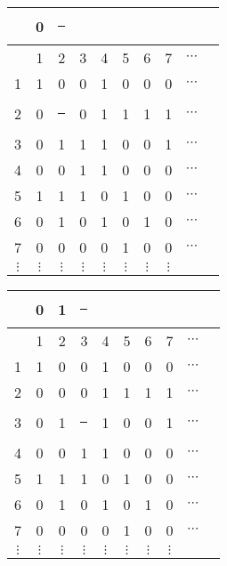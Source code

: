 \documentclass[compress,17pt]{beamer}
\newcommand\hl{\bgroup\markoverwith
    {\textcolor{yellow}{\rule[-.5ex]{.1pt}{2.5ex}}}\ULon}
\begin{document}
\begin{frame}
  \begin{tabular}{ | c | c c c c c c c c c }
    \hline
    &  0 & \hl 1 \\
    \hline
      & 1 & 2 & 3 & 4 & 5 & 6 & 7 & $\cdots$\\
      \hline
    1 & 1 & 0 & 0 & 1 & 0 & 0 & 0 & $\cdots$\\
    2 & 0 & \hl 0 & 0 & 1 & 1 & 1 & 1 & $\cdots$\\
    3 & 0 & 1 & 1 & 1 & 0 & 0 & 1 & $\cdots$\\
    4 & 0 & 0 & 1 & 1 & 0 & 0 & 0 & $\cdots$\\
    5 & 1 & 1 & 1 & 0 & 1 & 0 & 0 & $\cdots$\\
    6 & 0 & 1 & 0 & 1 & 0 & 1 & 0 & $\cdots$\\
    7 & 0 & 0 & 0 & 0 & 1 & 0 & 0 & $\cdots$\\
    $\vdots$ & $\vdots$ & $\vdots$ & $\vdots$ & $\vdots$ & $\vdots$ & $\vdots$ & $\vdots$ & \\
  \end{tabular}
\end{frame}

\begin{frame}
  \begin{tabular}{ | c | c c c c c c c c c }
    \hline
    &  0 & 1 & \hl 0 \\
    \hline
      & 1 & 2 & 3 & 4 & 5 & 6 & 7 & $\cdots$\\
      \hline
    1 & 1 & 0 & 0 & 1 & 0 & 0 & 0 & $\cdots$\\
    2 & 0 & 0 & 0 & 1 & 1 & 1 & 1 & $\cdots$\\
    3 & 0 & 1 & \hl 1 & 1 & 0 & 0 & 1 & $\cdots$\\
    4 & 0 & 0 & 1 & 1 & 0 & 0 & 0 & $\cdots$\\
    5 & 1 & 1 & 1 & 0 & 1 & 0 & 0 & $\cdots$\\
    6 & 0 & 1 & 0 & 1 & 0 & 1 & 0 & $\cdots$\\
    7 & 0 & 0 & 0 & 0 & 1 & 0 & 0 & $\cdots$\\
    $\vdots$ & $\vdots$ & $\vdots$ & $\vdots$ & $\vdots$ & $\vdots$ & $\vdots$ & $\vdots$ & \\
  \end{tabular}
\end{frame}
\end{document}
